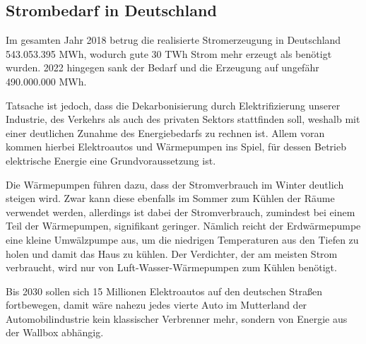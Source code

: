\documentclass[12pt, a4paper]{article}
\begin{document}
\subsection{Strombedarf in Deutschland}

Im gesamten Jahr 2018 betrug die realisierte Stromerzeugung in Deutschland 543.053.395 MWh, wodurch gute 30 TWh Strom mehr erzeugt als benötigt wurden. 2022 hingegen sank der Bedarf und die Erzeugung auf ungefähr 490.000.000 MWh.


Tatsache ist jedoch, dass die Dekarbonisierung durch Elektrifizierung unserer Industrie, des Verkehrs als auch des privaten Sektors stattfinden soll, weshalb mit einer deutlichen Zunahme des Energiebedarfs zu rechnen ist. Allem voran kommen hierbei Elektroautos und Wärmepumpen ins Spiel, für dessen Betrieb elektrische Energie eine Grundvoraussetzung ist. 

Die Wärmepumpen führen dazu, dass der Stromverbrauch im Winter deutlich steigen wird. Zwar kann diese ebenfalls im Sommer zum Kühlen der Räume verwendet werden, allerdings ist dabei der Stromverbrauch, zumindest bei einem Teil der Wärmepumpen, signifikant geringer. Nämlich reicht der Erdwärmepumpe eine kleine Umwälzpumpe aus, um die niedrigen Temperaturen aus den Tiefen zu holen und damit das Haus zu kühlen. Der Verdichter, der am meisten Strom verbraucht, wird nur von Luft-Wasser-Wärmepumpen zum Kühlen benötigt.


Bis 2030 sollen sich 15 Millionen Elektroautos auf den deutschen Straßen fortbewegen, damit wäre nahezu jedes vierte Auto im Mutterland der Automobilindustrie kein klassischer Verbrenner mehr, sondern von Energie aus der Wallbox abhängig.

\end{document}
